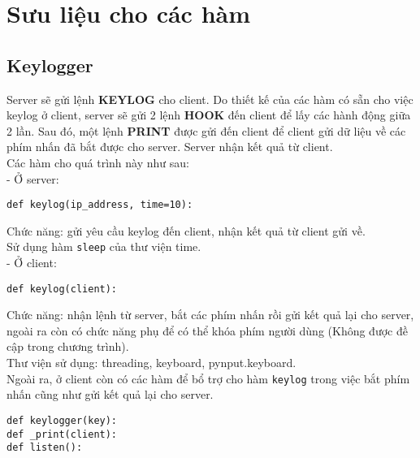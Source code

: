 \section{Sưu liệu cho các hàm}





\subsection{Keylogger}
Server sẽ gửi lệnh \textbf{KEYLOG} cho client. Do thiết kế của các hàm có sẵn cho việc keylog ở client, server sẽ gửi 2 lệnh \textbf{HOOK} đến client để lấy các hành động giữa 2 lần. Sau đó, một lệnh \textbf{PRINT} được gửi đến client để client gửi dữ liệu về các phím nhấn đã bắt được cho server. Server nhận kết quả từ client.\\
Các hàm cho quá trình này như sau:\\
- Ở server:
\begin{lstlisting}
def keylog(ip_address, time=10):
\end{lstlisting}
Chức năng: gửi yêu cầu keylog đến client, nhận kết quả từ client gửi về.\\
Sử dụng hàm \lstinline{sleep} của thư viện time.\\
- Ở client:
\begin{lstlisting}
def keylog(client):
\end{lstlisting}
Chức năng: nhận lệnh từ server, bắt các phím nhấn rồi gửi kết quả lại cho server, ngoài ra còn có chức năng phụ để có thể khóa phím người dùng (Không được đề cập trong chương trình).\\
Thư viện sử dụng: threading, keyboard, pynput.keyboard.\\
Ngoài ra, ở client còn có các hàm để bổ trợ cho hàm \lstinline{keylog} trong việc bắt phím nhấn cũng như gửi kết quả lại cho server.
\begin{lstlisting}
def keylogger(key):
def _print(client):
def listen():
\end{lstlisting}

